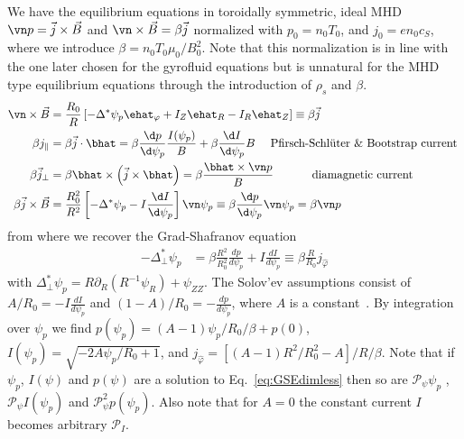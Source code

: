 We have the equilibrium equations in toroidally symmetric, ideal MHD
$\vn p = \vec j\times \vec B$ and $\vn\times\vec B = \beta \vec j$ normalized with $p_0 = n_0 T_0$, and $j_0 = e n_0 c_S$, where we introduce $\beta = n_0 T_0 \mu_0 /B_0^2$.
Note that this normalization is in line with the one later chosen for the gyrofluid
equations but is unnatural for the MHD type equilibrium equations through the introduction
of $\rho_s$ and $\beta$.
\begin{align}
    \vn\times \vec B &= \frac{R_0}{R}\left[ -\Delta^*\psi_p\ehat_\varphi + I_Z \ehat_R - I_R\ehat_Z \right]\equiv \beta \vec j\\
 \beta j_\parallel &= \beta \vec j\cdot \bhat = \beta \frac{\d p}{\d\psi_p} \frac{I(\psi_p)}{B} +
 \beta\frac{\d I}{\d\psi_p} B \quad \text{  Pfirsch-Schl\"uter \& Bootstrap current } \\
 \beta \vec j_\perp &= \beta \bhat\times\left(\vec j\times\bhat\right)=
 \beta \frac{\bhat \times \vn p}{B} \quad\quad\quad \text{ diamagnetic current} \\
 \beta \vec j\times\vec B &= \frac{R_0^2}{R^2}\left[ -\Delta^* \psi_p - I
     \frac{\d I}{\d \psi_p} \right]\vn\psi_p \equiv \beta \frac{\d p}{\d\psi_p}\vn\psi_p =\beta \vn p
\end{align}
from where we recover the Grad-Shafranov equation
\begin{align}\label{eq:GSEdimless}
    -\Delta^*_\perp  \psi_p &= \beta \frac{R^2}{R_0^2} \frac{d p}{d  \psi_p } + I \frac{d I}{d  \psi_p } \equiv \beta \frac{R}{R_0} j_{\hat\varphi}
\end{align}
with $\Delta^*_\perp \psi_p = R\partial_R (R^{-1}\psi_R) + \psi_{ZZ}$.
The Solov'ev assumptions consist of \(A/R_0 = -I \frac{d I}{d  \psi_p }\) and \((1-A)/R_0 = -\frac{d p}{d  \psi_p }\), where \(A\) is a constant~\cite{Cerfon2010,Cerfon2014}.
By integration over \(\psi_p\) we find
$
p(\psi_p) = (A-1)\psi_p/R_0/\beta + p(0)$, %
 $I(\psi_p) = \sqrt{-2 A \psi_p/R_0 + 1}$,
 and
    $j_{\hat\varphi} = \left[(A-1)R^2/R_0^2 - A \right]/R/\beta $.
Note that if $\psi_p$, $I(\psi)$ and $p(\psi)$ are a solution to Eq.~\eqref{eq:GSEdimless}
then so are $\mathcal P_\psi \psi_p$ , $\mathcal P_\psi I(\psi_p)$ and $\mathcal P_\psi^2 p(\psi_p)$.
Also note that for $A=0$ the constant current $I$ becomes arbitrary $\mathcal P_I$.

